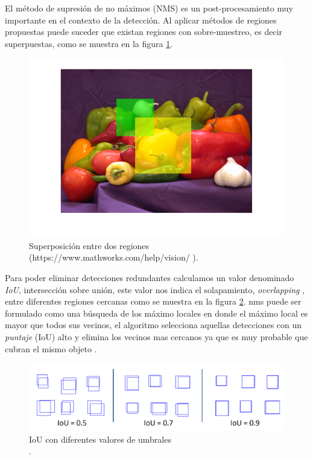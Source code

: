 El método de supresión de no máximos (NMS) es un post-procesamiento muy importante en el contexto de la detección. Al aplicar métodos de regiones propuestas puede suceder que existan regiones con sobre-muestreo, es decir superpuestas, como se muestra en la figura  \ref{Fig: overlapping}. 

\begin{figure}[H]
 \centering
  \includegraphics[scale=0.4,keepaspectratio=true,clip=true]{imagenes/MarcoTeorico/overlapMat.png}
  \caption{Superposición entre dos regiones \\ (https://www.mathworks.com/help/vision/ ).} \label{Fig: overlapping}
\end{figure}

Para poder eliminar detecciones redundantes calculamos un valor denominado  \textit{IoU}, intersección sobre unión,  este valor nos indica el solapamiento, \textit{overlapping} ,  entre diferentes regiones cercanas como se muestra en la figura \ref{Fig: interseccion}. \ac{nms} puede ser formulado como una búsqueda de los máximo locales en donde el máximo local es  mayor que todos sus vecinos,  el algoritmo selecciona aquellas detecciones con un \textit{puntaje} (IoU) alto y elimina los vecinos mas cercanos ya que es muy probable que cubran el mismo objeto \citep{nms2}.

\begin{figure}[H]
 \centering
  \includegraphics[scale=0.3,keepaspectratio=true,clip=true]{imagenes/MarcoTeorico/overlapping.png}
  \caption{IoU con diferentes valores de umbrales\\ \citep{bishop}.}\label{Fig: interseccion}
\end{figure}

